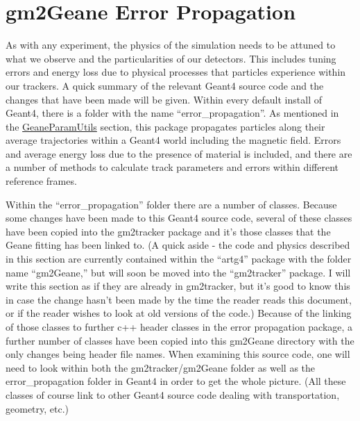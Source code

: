 \section{gm2Geane Error Propagation}
\label{sec:gm2Geane}


	As with any experiment, the physics of the simulation needs to be attuned to what we observe and the particularities of our detectors. This includes tuning errors and energy loss due to physical processes that particles experience within our trackers. A quick summary of the relevant Geant4 source code and the changes that have been made will be given. Within every default install of Geant4, there is a folder with the name ``error\_propagation''. As mentioned in the \hyperref[sec:GeaneParamUtils]{GeaneParamUtils} section, this package propagates particles along their average trajectories within a Geant4 world including the magnetic field. Errors and average energy loss due to the presence of material is included, and there are a number of methods to calculate track parameters and errors within different reference frames.

	Within the ``error\_propagation'' folder there are a number of classes. Because some changes have been made to this Geant4 source code, several of these classes have been copied into the gm2tracker package and it's those classes that the Geane fitting has been linked to. (A quick aside - the code and physics described in this section are currently contained within the ``artg4'' package with the folder name ``gm2Geane,'' but will soon be moved into the ``gm2tracker'' package. I will write this section as if they are already in gm2tracker, but it's good to know this in case the change hasn't been made by the time the reader reads this document, or if the reader wishes to look at old versions of the code.) Because of the linking of those classes to further c++ header classes in the error propagation package, a further number of classes have been copied into this gm2Geane directory with the only changes being header file names. When examining this source code, one will need to look within both the gm2tracker/gm2Geane folder as well as the error\_propagation folder in Geant4 in order to get the whole picture. (All these classes of course link to other Geant4 source code dealing with transportation, geometry, etc.)

